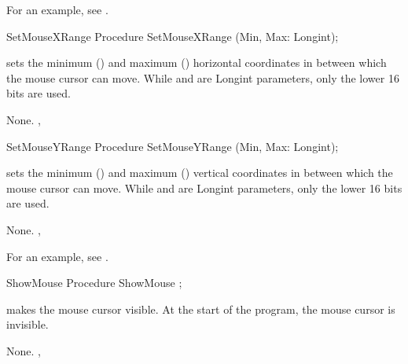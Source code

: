 For an example, see .

\begin{procedure}{SetMouseXRange}
\Declaration
Procedure SetMouseXRange (Min, Max: Longint);

\Description
 
sets the minimum () and maximum () horizontal coordinates in between which the
mouse cursor can move.
While  and  are Longint parameters, only the lower 16 bits 
are used.

\Errors
None.
\SeeAlso
{}, 
\end{procedure}


\begin{procedure}{SetMouseYRange}
\Declaration
Procedure SetMouseYRange (Min, Max: Longint);

\Description

sets the minimum () and maximum () vertical coordinates in between which the
mouse cursor can move.
While  and  are Longint parameters, only the lower 16 bits 
are used.

\Errors
None.
\SeeAlso
{}, 
\end{procedure}

For an example, see .

\begin{procedure}{ShowMouse}
\Declaration
Procedure ShowMouse ;

\Description

 makes the mouse cursor visible.
At the start of the program, the mouse cursor is invisible.

\Errors
None.
\SeeAlso
{},
\end{procedure}


